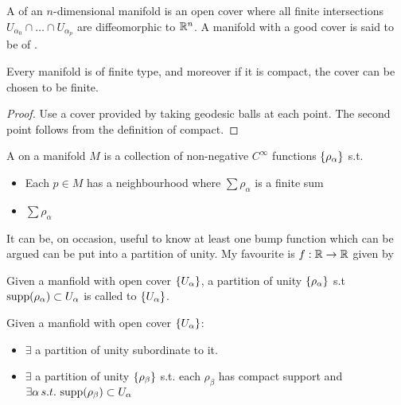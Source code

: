 \documentclass{article}
\begin{document}
\begin{definition}
	A  of an $n$-dimensional manifold is an open cover where all finite intersections $U_{\alpha_0} \cap \dots \cap U_{\alpha_p}$ are diffeomorphic to $\mathbb{R}^n$. A manifold with a good cover is said to be of . 
\end{definition}

\begin{theorem}
	Every manifold is of finite type, and moreover if it is compact, the cover can be chosen to be finite. 
\end{theorem}
\begin{proof}
	Use a cover provided by taking geodesic balls at each point. The second point follows from the definition of compact.
\end{proof}

\begin{definition}
	A  on a manifold $M$ is a collection of non-negative $C^\infty$ functions $\left\{ \rho_\alpha \right\}$ s.t. 
	\begin{itemize}
		\item Each $p \in M$ has a neighbourhood where $\sum \rho_\alpha$ is a finite sum
		\item $\sum \rho_\alpha$
	\end{itemize}
\end{definition}

\begin{remark}
	It can be, on occasion, useful to know at least one bump function which can be argued can be put into a partition of unity. My favourite is $f: \mathbb{R} \to \mathbb{R}$ given by  
\end{remark}

\begin{definition}
	Given a manfiold with open cover $\left\{ U_\alpha \right\}$, a partition of unity $\left\{ \rho_\alpha \right\}$ s.t $\operatorname{supp}(\rho_\alpha) \subset U_\alpha$ is called  to $\left\{ U_\alpha \right\}$. 
\end{definition}

\begin{prop}
	Given a manfiold with open cover $\left\{ U_\alpha \right\}$:
	\begin{itemize}
		\item $\exists$ a partition of unity subordinate to it.
		\item $\exists$ a partition of unity $\left\{ \rho_\beta \right\}$ s.t. each $\rho_\beta$ has compact support and $\exists \alpha \, s.t. \, \operatorname{supp}(\rho_\beta) \subset U_\alpha$ 
	\end{itemize}
\end{prop}
\end{document}
